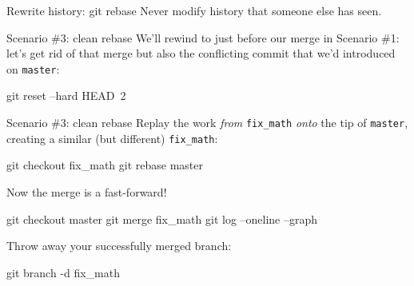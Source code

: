 \begin{frame}{Rewrite history: git rebase}
  \huge {
  Never modify history that someone else has seen.
  }
\end{frame}

\begin{frame}[fragile]{Scenario \#3: clean rebase}
  We'll rewind to just before our merge in Scenario \#1: let's get rid
  of that merge but also the conflicting commit that we'd introduced
  on \texttt{master}:

  \begin{gitCommand}git reset --hard HEAD~2\end{gitCommand}
\end{frame}

\begin{frame}[fragile]{Scenario \#3: clean rebase}
  Replay the work \emph{from} \texttt{fix\_math} \emph{onto} the tip
  of \texttt{master}, creating a similar (but
  different) \texttt{fix\_math}:

  \begin{gitCommand}
git checkout fix_math
git rebase master
  \end{gitCommand}

  Now the merge is a fast-forward!

  \begin{gitCommand}
git checkout master
git merge fix_math
git log --oneline --graph
  \end{gitCommand}

  Throw away your successfully merged branch:

  \begin{gitCommand}git branch -d fix_math\end{gitCommand}
\end{frame}


